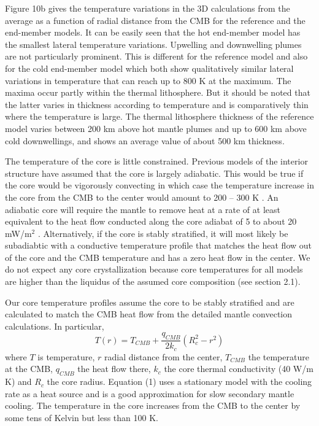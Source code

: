 Figure 10b gives the temperature variations in the 3D calculations from the average as a function of radial distance from the CMB for the reference and the end-member models. It can be easily seen that the hot end-member model has the smallest lateral temperature variations. Upwelling and downwelling plumes are not particularly prominent. This is different for the reference model and also for the cold end-member model which both show qualitatively similar lateral variations in temperature that can reach up to 800 K at the maximum. The maxima occur partly within the thermal lithosphere. But it should be noted that the latter varies in thickness according to temperature and is comparatively thin where the temperature is large. The thermal lithosphere thickness of the reference model varies between 200 km above hot mantle plumes and up to 600 km above cold downwellings, and shows an average value of about 500 km thickness. 

The temperature of the core is little constrained. Previous models of the interior structure \citep[e.g.,][]{Sohl1997, Bertka1997, Hauck2002, Williams2004, Fei2005, Rivoldini2011, Khan2018} have assumed that the core is largely adiabatic. This would be true if the core would be vigorously convecting in which case the temperature increase in the core from the CMB to the center would amount to 200 – 300 K \citep[e.g.,][]{Sohl1997, Rivoldini2011}.  An adiabatic core will require the mantle to remove heat at a rate of at least equivalent to the heat flow conducted along the core adiabat of 5 to about 20 mW/m$^2$ \citep{Nimmo2000}. Alternatively, if the core is stably stratified, it will most likely be subadiabtic with a conductive temperature profile that matches the heat flow out of the core and the CMB temperature and has a zero heat flow in the center. We do not expect any core crystallization because core temperatures for all models are higher than the liquidus of the assumed core composition (see section 2.1).  

Our core temperature profiles assume the core to be stably stratified and are calculated to match the CMB heat flow from the detailed mantle convection calculations. In particular, 
%
\begin{equation}
T(r)=T_{CMB}+\frac{q_{CMB}}{2k_c}\left(R_c^2-r^2\right)
\end{equation} 
%    
where $T$ is temperature, $r$ radial distance from the center, $T_{CMB}$ the temperature at the CMB,  $q_{CMB}$ the heat flow there, $k_c$ the core thermal conductivity (40 W/m K) and $R_c$ the core radius. Equation (1) uses a stationary model with the cooling rate as a heat source and is a good approximation for slow secondary mantle cooling. The temperature in the core increases from the CMB to the center by some tens of Kelvin but less than 100 K. 
